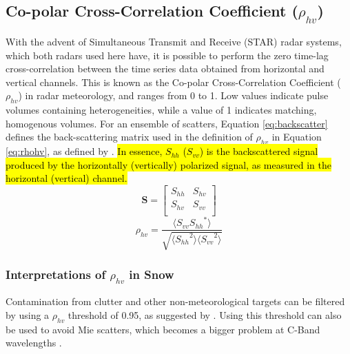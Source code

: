 \subsection{Co-polar Cross-Correlation Coefficient ($\rho_{hv}$)}
With the advent of Simultaneous Transmit and Receive (STAR) radar systems, which both radars used here have, it is possible to perform the zero time-lag
cross-correlation between the time series data obtained from horizontal and vertical channels. This is known as the Co-polar Cross-Correlation Coefficient
($\rho_{hv}$) in radar meteorology, and ranges from 0 to 1. Low values indicate pulse volumes containing heterogeneities, while a value of 1 indicates
matching, homogenous volumes. For an ensemble of scatters, Equation \ref{eq:backscatter} defines the back-scattering matrix used in the definition of
$\rho_{hv}$ in Equation \ref{eq:rhohv}, as defined by \citet{Ryzhkov2007b}. \hl{In essence, $S_{hh}$ ($S_{vv}$) is the backscattered signal produced by the horizontally (vertically) polarized signal, as measured in the horizontal (vertical) channel.}
\begin{equation}\label{eq:backscatter}
\mathbf{S} = \begin{bmatrix}
             S_{hh}       & S_{hv} \\
             S_{hv}       & S_{vv} \\
             \end{bmatrix}
\end{equation}
\begin{equation}\label{eq:rhohv}
\rho_{hv} = \frac{\langle{S_{vv}{S_{hh}}^{*}\rangle}}{\sqrt{\langle{{S_{hh}}^{2}\rangle}\langle{{S_{vv}}^{2}\rangle}}}
\end{equation}
\subsubsection{Interpretations of $\rho_{hv}$ in Snow}
Contamination from clutter and other non-meteorological targets can be filtered by using a $\rho_{hv}$ threshold of 0.95, as suggested by \citet{Straka2000}.
Using this threshold can also be used to avoid Mie scatters, which becomes a bigger problem at C-Band wavelengths \citet{Fabry2015}.
 



